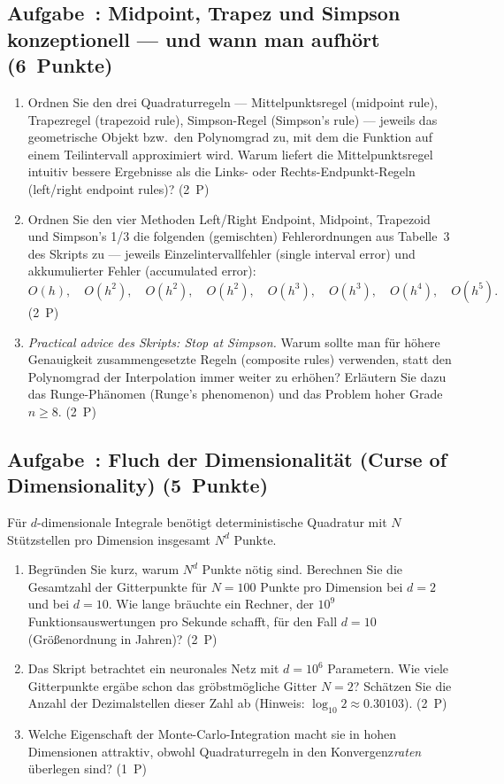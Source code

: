 \documentclass[a4paper,11pt]{scrartcl}
\newcounter{aufgabe}
\newcommand{\Aufgabe}[2]{%
  \refstepcounter{aufgabe}%
  \subsection*{Aufgabe~\theaufgabe: #1 \hfill (#2~Punkte)}%
  \label{auf:\theaufgabe}}
\begin{document}
\schreibraum[8]
\Aufgabe{Midpoint, Trapez und Simpson konzeptionell --- und wann man aufhört}{6}

\begin{enumerate}[label=(\alph*)]
  \item Ordnen Sie den drei Quadraturregeln --- Mittelpunktsregel (midpoint rule), Trapezregel (trapezoid rule), Simpson-Regel (Simpson's rule) --- jeweils das geometrische Objekt bzw.\ den Polynomgrad zu, mit dem die Funktion auf einem Teilintervall approximiert wird. Warum liefert die Mittelpunktsregel intuitiv bessere Ergebnisse als die Links- oder Rechts-Endpunkt-Regeln (left/right endpoint rules)? \hfill (2~P)
  \item Ordnen Sie den vier Methoden Left/Right Endpoint, Midpoint, Trapezoid und Simpson's 1/3 die folgenden (gemischten) Fehlerordnungen aus Tabelle~3 des Skripts zu --- jeweils Einzelintervallfehler (single interval error) und akkumulierter Fehler (accumulated error):
  \[ O(h),\quad O(h^2),\quad O(h^2),\quad O(h^2),\quad O(h^3),\quad O(h^3),\quad O(h^4),\quad O(h^5). \]
  \hfill (2~P)
  \item \emph{Practical advice des Skripts: \glqq Stop at Simpson.\grqq} Warum sollte man für höhere Genauigkeit zusammengesetzte Regeln (composite rules) verwenden, statt den Polynomgrad der Interpolation immer weiter zu erhöhen? Erläutern Sie dazu das Runge-Phänomen (Runge's phenomenon) und das Problem hoher Grade $n \geq 8$. \hfill (2~P)
\end{enumerate}

\schreibraum[9]
\Aufgabe{Fluch der Dimensionalität (Curse of Dimensionality)}{5}

Für $d$-dimensionale Integrale benötigt deterministische Quadratur mit $N$ Stützstellen pro Dimension insgesamt $N^d$ Punkte.

\begin{enumerate}[label=(\alph*)]
  \item Begründen Sie kurz, warum $N^d$ Punkte nötig sind. Berechnen Sie die Gesamtzahl der Gitterpunkte für $N = 100$ Punkte pro Dimension bei $d = 2$ und bei $d = 10$. Wie lange bräuchte ein Rechner, der $10^9$ Funktionsauswertungen pro Sekunde schafft, für den Fall $d = 10$ (Größenordnung in Jahren)? \hfill (2~P)
  \item Das Skript betrachtet ein neuronales Netz mit $d = 10^6$ Parametern. Wie viele Gitterpunkte ergäbe schon das gröbstmögliche Gitter $N = 2$? Schätzen Sie die Anzahl der Dezimalstellen dieser Zahl ab (Hinweis: $\log_{10} 2 \approx 0.30103$). \hfill (2~P)
  \item Welche Eigenschaft der Monte-Carlo-Integration macht sie in hohen Dimensionen attraktiv, obwohl Quadraturregeln in den Konvergenz\emph{raten} überlegen sind? \hfill (1~P)
\end{enumerate}
\end{document}
